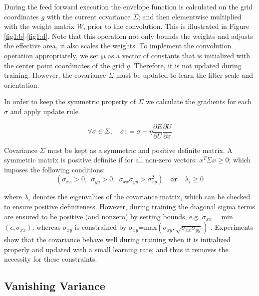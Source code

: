 \documentclass{bmvc2k}
\begin{document}
During the feed forward execution the envelope function is calculated on the grid coordinates $g$ with the current covariance $\Sigma$; and then elementwise multiplied with the weight matrix $W$, prior to the convolution. This is illustrated in Figure \ref{fig1:b}-\ref{fig1:d}. Note that this operation not only bounds the weights and adjusts the effective area, it also scales the weights. To implement the convolution operation appropriately, we set $\boldsymbol{\mu}$ as a vector of constants that is initialized with the center point coordinates of the grid $g$. Therefore, it is not updated during training. However, the covariance $\Sigma$ must be updated to learn the filter scale and orientation.





In order to keep the symmetric property of $\Sigma$ we calculate the gradients for each $\sigma$ and apply update rule.


\begin{equation}
\label{eq:derivesigma}
\forall \sigma \in \Sigma, \quad \sigma \mathrel{{:}{=}} \sigma - \eta \frac{\partial E}{\partial U} \frac{\partial U}{\partial \sigma}
\end{equation}


Covariance $\Sigma$ must be kept as a symmetric and positive definite matrix.
A symmetric matrix is positive definite if for all non-zero vectors: $x^T \Sigma x\ge0$; which imposes the following conditions:
\begin{equation}
 \left( \sigma_{xx}>0, \: \: \sigma_{yy}>0, \: \: \sigma_{xx}\sigma_{yy}>\sigma^2_{xy}\right)  \quad
  \mathtt{or} \quad
 \lambda_i \ge 0
\end{equation}

where $\lambda_i$ denotes the eigenvalues of the covariance matrix, which can be checked to ensure positive definiteness. However, during training the diagonal sigma terms are ensured to be positive (and nonzero) by setting bounds, e.g. $\sigma_{xx}=$min$\left(\epsilon,\sigma_{xx}\right)$; whereas $\sigma_{xy}$ is constrained by $\sigma_{xy}$=max$\left(\sigma_{xy},\sqrt{\sigma_{xx}\sigma_{yy}}\right)$ . Experiments show that the covariance behave well during training when it is initialized properly and updated with a small learning rate; and thus it removes the necessity for these constraints. 



\subsection{Vanishing Variance}
\end{document}
